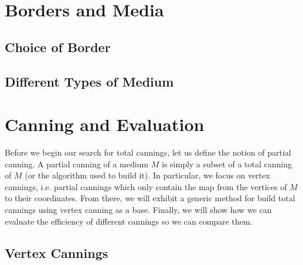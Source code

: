 \documentclass{article}
\begin{document}
\renewcommand{\thesection}{\arabic{section}}
\setcounter{section}{0}

\section{Borders and Media}

\subsection{Choice of Border}

\subsection{Different Types of Medium}

\section{Canning and Evaluation}

Before we begin our search for total cannings, let us define the notion of partial canning. A partial canning of a medium $M$ is simply a subset of a total canning of $M$ (or the algorithm used to build it). In particular, we focus on vertex cannings, i.e. partial cannings which only contain the map from the vertices of $M$ to their coordinates. From there, we will exhibit a generic method for build total cannings using vertex canning as a base. Finally, we will show how we can evaluate the efficiency of different cannings so we can compare them.

\subsection{Vertex Cannings}
\label{partial_canning}
\end{document}
